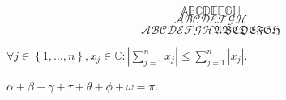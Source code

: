 \begin{exampletwoup}
\begin{equation}\mathbb{ABCDEFGH}\end{equation}
\begin{equation*}\mathscr{ABCDEFGH}\end{equation*}
\[\mathcal{ABCDEFGH}\mathfrak{ABCDEFGH}\]

\begin{math}
\forall j\in\left\{1,\dotsc,n\right\},
x_{j}\in\mathbb{C}:
\left|\sum_{j=1}^{n}x_{j}\right|\leq
\sum_{j=1}^{n}\left|x_{j}\right|
\end{math}.

$\alpha+\beta+\gamma+\tau+\theta+\phi+\omega=\pi$.
\end{exampletwoup}
